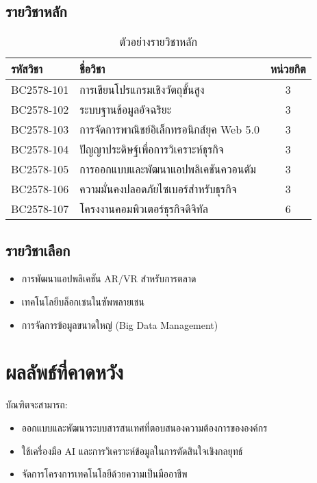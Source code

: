\documentclass[a4paper,12pt]{article}
\begin{document}
\subsection{รายวิชาหลัก}
\begin{table}[h]
    \centering
    \begin{tabular}{p{4cm}p{8cm}c}
        \toprule
        \textbf{รหัสวิชา} & \textbf{ชื่อวิชา} & \textbf{หน่วยกิต} \\
        \midrule
        BC2578-101 & การเขียนโปรแกรมเชิงวัตถุขั้นสูง & 3 \\
        BC2578-102 & ระบบฐานข้อมูลอัจฉริยะ & 3 \\
        BC2578-103 & การจัดการพาณิชย์อิเล็กทรอนิกส์ยุค Web 5.0 & 3 \\
        BC2578-104 & ปัญญาประดิษฐ์เพื่อการวิเคราะห์ธุรกิจ & 3 \\
        BC2578-105 & การออกแบบและพัฒนาแอปพลิเคชันควอนตัม & 3 \\
        BC2578-106 & ความมั่นคงปลอดภัยไซเบอร์สำหรับธุรกิจ & 3 \\
        BC2578-107 & โครงงานคอมพิวเตอร์ธุรกิจดิจิทัล & 6 \\
        \bottomrule
    \end{tabular}
    \caption{ตัวอย่างรายวิชาหลัก}
\end{table}

\subsection{รายวิชาเลือก}
\begin{itemize}
    \item การพัฒนาแอปพลิเคชัน AR/VR สำหรับการตลาด
    \item เทคโนโลยีบล็อกเชนในซัพพลายเชน
    \item การจัดการข้อมูลขนาดใหญ่ (Big Data Management)
\end{itemize}

\section{ผลลัพธ์ที่คาดหวัง}
บัณฑิตจะสามารถ:
\begin{itemize}
    \item ออกแบบและพัฒนาระบบสารสนเทศที่ตอบสนองความต้องการขององค์กร
    \item ใช้เครื่องมือ AI และการวิเคราะห์ข้อมูลในการตัดสินใจเชิงกลยุทธ์
    \item จัดการโครงการเทคโนโลยีด้วยความเป็นมืออาชีพ
\end{itemize}

\end{document}
